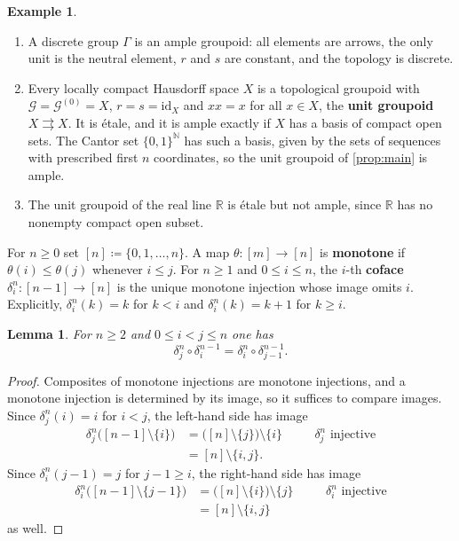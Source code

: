 \documentclass{extracta-temp-26}
\numberwithin{equation}{section}
\newtheorem{lem}[teo]{Lemma}
\theoremstyle{definition}
\newtheorem{exa}[teo]{Example}
\theoremstyle{remark}
\newcommand{\G}{\mathcal{G}}
\newcommand{\N}{\mathbb{N}}
\newcommand{\R}{\mathbb{R}}
\newcommand{\id}{\mathrm{id}}
\newcommand{\term}[1]{\textbf{#1}}
\begin{document}
\begin{exa}\label{ex:unit}~
\begin{enumerate}
\item\label{it:ex-group} A discrete group \(\Gamma\) is an ample groupoid: all elements are arrows, the only unit is the neutral element, \(r\) and \(s\) are constant, and the topology is discrete.
\item\label{it:ex-unit} Every locally compact Hausdorff space \(X\) is a topological groupoid with \(\G=\G^{(0)}=X\), \(r=s=\id_X\) and \(xx=x\) for all \(x\in X\), the \term{unit groupoid} \(X\rightrightarrows X\).
It is \'etale, and it is ample exactly if \(X\) has a basis of compact open sets.
The Cantor set \(\{0,1\}^{\N}\) has such a basis, given by the sets of sequences with prescribed first \(n\) coordinates, so the unit groupoid of \cref{prop:main} is ample.
\item\label{it:ex-real} The unit groupoid of the real line \(\R\) is \'etale but not ample, since \(\R\) has no nonempty compact open subset.
\end{enumerate}
\end{exa}

For \(n\ge 0\) set \([n]\coloneqq\{0,1,\dots,n\}\).
A map \(\theta\colon[m]\to[n]\) is \term{monotone} if \(\theta(i)\le\theta(j)\) whenever \(i\le j\).
For \(n\ge 1\) and \(0\le i\le n\), the \(i\)-th \term{coface} \(\delta^n_i\colon[n-1]\to[n]\) is the unique monotone injection whose image omits \(i\).
Explicitly, \(\delta^n_i(k)=k\) for \(k<i\) and \(\delta^n_i(k)=k+1\) for \(k\ge i\).

\begin{lem}\label{lem:coface}
For \(n\ge 2\) and \(0\le i<j\le n\) one has
\begin{equation}\label{eq:coface-identity}
\delta^n_j\circ\delta^{n-1}_i=\delta^n_i\circ\delta^{n-1}_{j-1}.
\end{equation}
\end{lem}

\begin{proof}
Composites of monotone injections are monotone injections, and a monotone injection is determined by its image, so it suffices to compare images.
Since \(\delta^n_j(i)=i\) for \(i<j\), the left-hand side has image
\begin{equation}\label{eq:coface-left}
\begin{aligned}
\delta^n_j\bigl([n-1]\setminus\{i\}\bigr)
&=\bigl([n]\setminus\{j\}\bigr)\setminus\{i\}&&\quad\text{\(\delta^n_j\) injective}\\
&=[n]\setminus\{i,j\}.
\end{aligned}
\end{equation}
Since \(\delta^n_i(j-1)=j\) for \(j-1\ge i\), the right-hand side has image
\begin{equation}\label{eq:coface-right}
\begin{aligned}
\delta^n_i\bigl([n-1]\setminus\{j-1\}\bigr)
&=\bigl([n]\setminus\{i\}\bigr)\setminus\{j\}&&\quad\text{\(\delta^n_i\) injective}\\
&=[n]\setminus\{i,j\}
\end{aligned}
\end{equation}
as well.
\end{proof}
\end{document}
